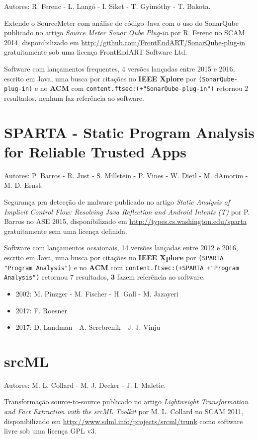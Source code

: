 Autores:
R. Ferenc - L. Langó - I. Siket - T. Gyimóthy - T. Bakota.

Extende o SourceMeter com análise de código Java com o uso do SonarQube
publicado no artigo {\it Source Meter Sonar Qube Plug-in}
por R. Ferenc
no SCAM 2014,
disponibilizado em \url{http://github.com/FrontEndART/SonarQube-plug-in}
gratuitamente
sob uma licença FrontEndART Software Ltd.

Software com lançamentos frequentes,
4 versões lançadas
entre 2015 e 2016,
escrito em Java,
uma busca por citações no {\bf IEEE Xplore} por
\texttt{(SonarQube-plug-in)}
e no {\bf ACM} com
\texttt{content.ftsec:(+"SonarQube-plug-in")}
retornou
2 resultados,
nenhum faz referência ao software.


\section{SPARTA - Static Program Analysis for Reliable Trusted Apps}

Autores:
P. Barros - R. Just - S. Millstein - P. Vines - W. Dietl - M. dAmorim - M. D. Ernst.

Segurança pra detecção de malware
publicado no artigo {\it Static Analysis of Implicit Control Flow: Resolving Java Reflection and Android Intents (T)}
por P. Barros
no ASE 2015,
disponibilizado em \url{http://types.cs.washington.edu/sparta}
gratuitamente
sem uma licença definida.

Software com lançamentos ocsaionais,
14 versões lançadas
entre 2012 e 2016,
escrito em Java,
uma busca por citações no {\bf IEEE Xplore} por
\texttt{(SPARTA "Program Analysis")}
e no {\bf ACM} com
\texttt{content.ftsec:(+SPARTA +"Program Analysis")}
retornou
7 resultados,
{\bf 3} fazem referência ao software.

\begin{itemize}
\item 2002: M. Pinzger - M. Fischer - H. Gall - M. Jazayeri
\item 2017: F. Roesner
\item 2017: D. Landman - A. Serebrenik - J. J. Vinju
\end{itemize}

\section{srcML}

Autores:
M. L. Collard - M. J. Decker - J. I. Maletic.

Transformação source-to-source
publicado no artigo {\it Lightweight Transformation and Fact Extraction with the srcML Toolkit}
por M. L. Collard
no SCAM 2011,
disponibilizado em \url{http://www.sdml.info/projects/srcml/trunk}
como software livre
sob uma licença GPL v3.

